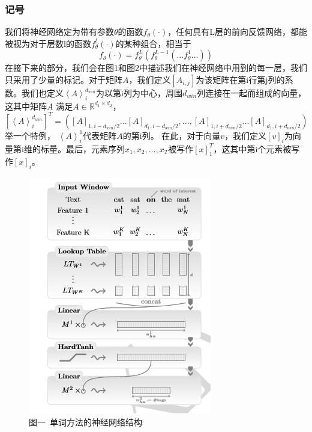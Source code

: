 \subsubsection*{记号}
我们将神经网络定为带有参数$\theta$的函数$f_{\theta}(\cdot)$，任何具有L层的前向反馈网络，都能被视为对于层数l的函数$f_{\theta}^{l}(\cdot)$的某种组合，相当于
$$
f_{\theta}(\cdot) = f_{\theta}^{L}(f_{\theta}^{L-1}(...f_{\theta}^{1}...))
$$
在接下来的部分，我们会在图1和图2中描述我们在神经网络中用到的每一层，我们只采用了少量的标记。对于矩阵$A$，我们定义$[A_{i,j}]$为该矩阵在第i行第j列的系数。我们也定义${\left \langle A \right \rangle}^{d_{win}}_i$为以第i列为中心，周围$d_{win}$列连接在一起而组成的向量，这其中矩阵$A$ 满足$A\in \mathbb{R}^{d_1 \times d_2}$，
$
{[{\left \langle A \right \rangle}^{d_{win}}_i]}^T = ({[A]}_{1, i - d_{win} / 2}...{[A]}_{d_1, i - d_{win} / 2}, ..., {[A]}_{1, i + d_{win} / 2}...{[A]}_{d_1, i + d_{win} / 2})
$
举一个特例， ${\left \langle A \right \rangle}^1_i$代表矩阵$A$的第i列。
在此，对于向量$\mathit{v}$，我们定义${[{\mathit{v}}]}_i$为向量第i维的标量。最后，元素序列${x_1,x_2,...,x_T}$被写作${[x]}_1^T$，这其中第i个元素被写作${[x]}_i$。
\begin{figure}[!hbp]
\begin{center}
\includegraphics[width=\textwidth]{translations/f1.png}
\caption*{图一\ 单词方法的神经网络结构 \label{translation_f1}}
\end{center}
\end{figure}

